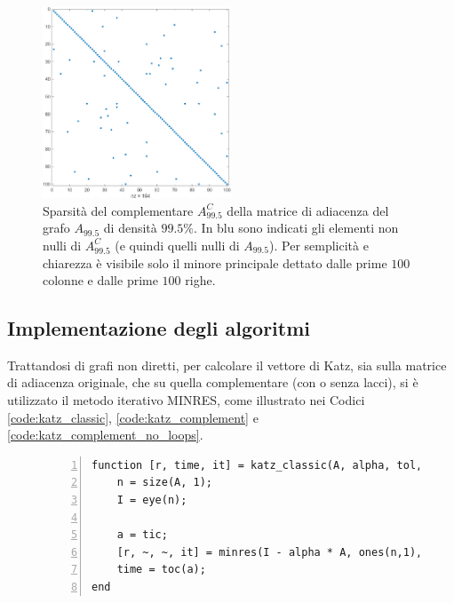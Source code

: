 \documentclass[a4paper]{article}
\newcommand{\evec}{{\bf e}}
\newcommand{\xvec}{{\bf x}}
\begin{document}
\begin{figure}[H]
    \centering
    \includegraphics[width=0.5\textwidth]{images/995_spy.png} %
    \caption{Sparsità del complementare $A_{99.5}^C$ della matrice di adiacenza del grafo $A_{99.5}$ di densità $99.5\%$. In blu sono indicati gli elementi non nulli
    di $A_{99.5}^C$ (e quindi quelli nulli di $A_{99.5}$). Per semplicità e chiarezza è visibile solo il minore principale dettato dalle prime $100$ colonne e dalle
    prime $100$ righe.}
    \label{fig:spy_995}
\end{figure}

\subsection{Implementazione degli algoritmi}

Trattandosi di grafi non diretti, per calcolare il vettore di Katz, sia sulla matrice di adiacenza originale, che su quella complementare (con o senza lacci), si è
utilizzato il metodo iterativo MINRES, come illustrato nei Codici \ref{code:katz_classic}, \ref{code:katz_complement} e \ref{code:katz_complement_no_loops}.

\begin{figure}[H]
    \centering
    \begin{lstlisting}[style=Matlab-editor, frame=single, numbers=left, caption={Contenuto del file \texttt{katz\_classic.m}. La funzione risolve iterativamente col metodo MINRES il classico sistema $(I - \alpha A) \xvec = \evec$. I valori restituiti sono il vettore di Katz (\texttt{r}), il tempo impiegato per eseguire il metodo MINRES (\texttt{time}) e il numero di iterazioni del suddetto metodo (\texttt{it}).}, captionpos=b, label=code:katz_classic]
function [r, time, it] = katz_classic(A, alpha, tol, maxit)
    n = size(A, 1);
    I = eye(n);
    
    a = tic;
    [r, ~, ~, it] = minres(I - alpha * A, ones(n,1), tol, maxit);
    time = toc(a);
end      
    \end{lstlisting}
\end{figure}
\end{document}
